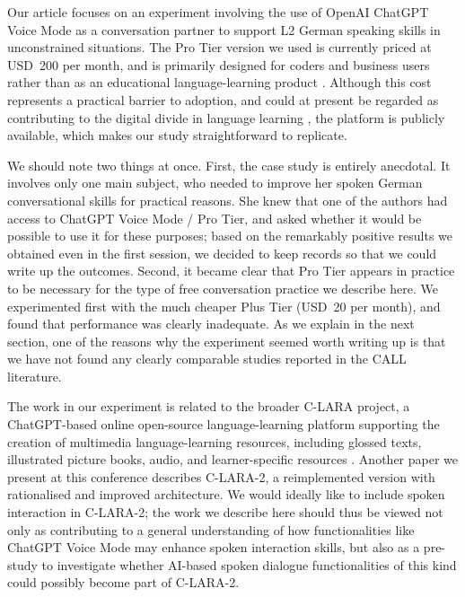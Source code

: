 \documentclass[11pt,a4paper]{article}
\begin{document}
Our article focuses on an experiment involving the use of OpenAI ChatGPT Voice Mode as a conversation partner to support L2 German speaking skills in unconstrained situations. The Pro Tier version we used is currently priced at USD~200 per month, and is primarily designed for coders and business users rather than as an educational language-learning product \citep{Reuters2024}. Although this cost represents a practical barrier to adoption, and could at present be regarded as contributing to the digital divide in language learning \citep{Yaman2015}, the platform is publicly available, which makes our study straightforward to replicate.

We should note two things at once. First, the case study is entirely anecdotal. It involves only one main subject, who needed to improve her spoken German conversational skills for practical reasons. She knew that one of the authors had access to ChatGPT Voice Mode / Pro Tier, and asked whether it would be possible to use it for these purposes; based on the remarkably positive results we obtained even in the first session, we decided to keep records so that we could write up the outcomes. Second, it became clear that Pro Tier appears in practice to be necessary for the type of free conversation practice we describe here. We experimented first with the much cheaper Plus Tier (USD~20 per month), and found that performance was clearly inadequate. As we explain in the next section, one of the reasons why the experiment seemed worth writing up is that we have not found any clearly comparable studies reported in the CALL literature.

The work in our experiment is related to the broader C-LARA project, a ChatGPT-based online open-source language-learning platform supporting the creation of multimedia language-learning resources, including glossed texts, illustrated picture books, audio, and learner-specific resources \citep{BediEtAl2025}. Another paper we present at this conference describes C-LARA-2, a reimplemented version with rationalised and improved architecture. We would ideally like to include spoken interaction in C-LARA-2; the work we describe here should thus be viewed not only as contributing to a general understanding of how functionalities like ChatGPT Voice Mode may enhance spoken interaction skills, but also as a pre-study to investigate whether AI-based spoken dialogue functionalities of this kind could possibly become part of C-LARA-2.
\end{document}
